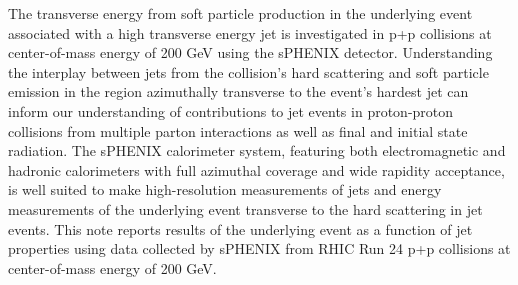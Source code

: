 The transverse energy from soft particle production in the underlying event associated with a high transverse energy jet is investigated in p+p collisions at center-of-mass energy of 200 GeV using the sPHENIX detector. Understanding the interplay between jets from the collision’s hard scattering and soft particle emission in the region azimuthally transverse to the event’s hardest jet can inform our understanding of contributions to jet events in proton-proton collisions from multiple parton interactions as well as final and initial state radiation. The sPHENIX calorimeter system, featuring both electromagnetic and hadronic calorimeters with full azimuthal coverage and wide rapidity acceptance, is well suited to make high-resolution measurements of jets and energy measurements of the underlying event transverse to the hard scattering in jet events. This note reports results of the underlying event as a function of jet properties using data collected by sPHENIX from RHIC Run 24 p+p collisions at center-of-mass energy of 200 GeV. 
